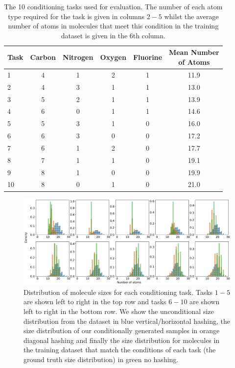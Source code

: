 \begin{table}[h]
     \centering
   \caption{The 10 conditioning tasks used for evaluation. The number of each atom type required for the task is given in columns $2-5$ whilst the average number of atoms in molecules that meet this condition in the training dataset is given in the $6$th column.}
   \begin{tabular}{@{}lccccc@{}}
     \toprule
     Task & Carbon & Nitrogen & Oxygen & Fluorine & \shortstack{Mean Number \\ of Atoms} \\ \midrule
     1 & 4 & 1 & 2 & 1 & 11.9 \\
     2 & 4 & 3 & 1 & 1 & 13.0 \\
     3 & 5 & 2 & 1 & 1 & 13.9 \\
     4 & 6 & 0 & 1 & 1 & 14.6\\
     5 & 5 & 3 & 1 & 0 & 16.0\\
     6 & 6 & 3 & 0 & 0 & 17.2\\
     7 & 6 & 1 & 2 & 0 & 17.7\\
     8 & 7 & 1 & 1 & 0 & 19.1\\
     9 & 8 & 1 & 0 & 0 & 19.9\\
     10 & 8 & 0 & 1 & 0 & 21.0\\ \bottomrule
   \end{tabular}
   \label{tab:molecule_conditions}
\end{table}

\begin{figure}
    \centering
    \includegraphics[width=\textwidth]{figs/tddm/cond_dims.pdf}
    \caption{Distribution of molecule sizes for each conditioning task. Tasks $1-5$ are shown left to right in the top row and tasks $6-10$ are shown left to right in the bottom row. We show the unconditional size distribution from the dataset in blue vertical/horizontal hashing, the size distribution of our conditionally generated samples in orange diagonal hashing and finally the size distribution for molecules in the training dataset that match the conditions of each task (the ground truth size distribution) in green no hashing.}
    \label{fig:tddm-apdx_CondDims}
\end{figure}



